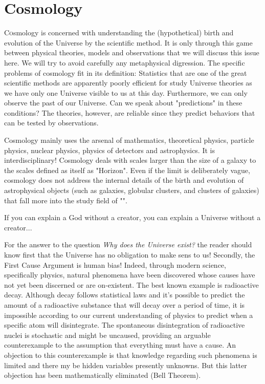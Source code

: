 	\newpage
	\thispagestyle{empty}
	\mbox{}
	\section{Cosmology}
	\lettrine[lines=4]{\color{BrickRed}C}osmology is concerned with understanding the (hypothetical) birth and evolution of the Universe by the scientific method. It is only through this game between physical theories, models and observations that we will discuss this issue here. We will try to avoid carefully any metaphysical digression. The specific problems of cosmology fit in its definition: Statistics that are one of the great scientific methods are apparently poorly efficient for study Universe theories as we have only one Universe visible to us at this day. Furthermore, we can only observe the past of our Universe. Can we speak about "predictions" in these conditions? The theories, however, are reliable since they predict behaviors that can be tested by observations.
	
	Cosmology mainly uses the arsenal of mathematics, theoretical physics, particle physics, nuclear physics, physics of detectors and astrophysics. It is interdisciplinary! Cosmology deals with scales larger than the size of a galaxy to the scales defined as itself as "Horizon". Even if the limit is deliberately vague, cosmology does not address the internal details of the birth and evolution of astrophysical objects (such as galaxies, globular clusters, and clusters of galaxies) that fall more into the study field of "".
	
	\begin{fquote}[]If you can explain a God without a creator, you can explain a Universe without a creator...
 	\end{fquote}
	\begin{tcolorbox}[title=Remark,colframe=black,arc=10pt]
	For the answer to the question \textit{Why does the Universe exist?} the reader should know first that the Universe has no obligation to make sens to us! Secondly, the First Cause Argument is human bias! Indeed, through modern science, specifically physics, natural phenomena have been discovered whose causes have not yet been discerned or are on-existent. The best known example is radioactive decay. Although decay follows statistical laws and it's possible to predict the amount of a radioactive substance that will decay over a period of time, it is impossible according to our current understanding of physics to predict when a specific atom will disintegrate. The spontaneous disintegration of radioactive nuclei is stochastic and might be uncaused, providing an arguable counterexample to the assumption that everything must have a cause.  An objection to this counterexample is that knowledge regarding such phenomena is limited and there my be hidden variables presently unknowns. But this latter objection has been mathematically eliminated (Bell Theorem).
	\end{tcolorbox}
